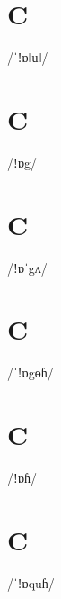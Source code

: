 \documentclass[10pt,a4paper,twoside]{book}
\begin{document}
\section*{C}

\begin{multicols}{3}
 {/ˈǃɒǁʉǁ/} {}
\end{multicols}

\section*{C}

\begin{multicols}{3}
 {/ǃɒg/} {}
\end{multicols}

\section*{C}

\begin{multicols}{3}
 {/ǃɒˈgʌ/} {}
\end{multicols}

\section*{C}

\begin{multicols}{3}
 {/ˈǃɒgɵɦ/} {}
\end{multicols}

\section*{C}

\begin{multicols}{3}
 {/ǃɒɦ/} {}
\end{multicols}

\section*{C}

\begin{multicols}{3}
 {/ˈǃɒquɦ/} {}
\end{multicols}
\end{document}
